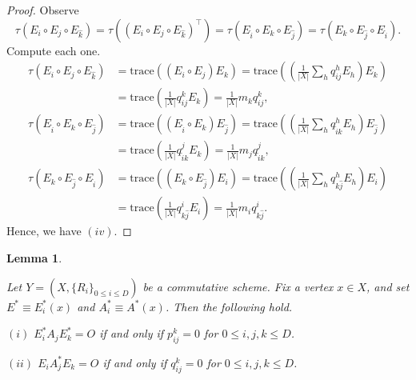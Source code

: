 \documentclass[
]{book}
\newtheorem{lemma}{Lemma}[chapter]
\theoremstyle{definition}
\theoremstyle{definition}
\theoremstyle{definition}
\theoremstyle{definition}
\theoremstyle{remark}
\begin{document}
\begin{proof}
Observe
\[\tau(E_i\circ E_j \circ E_{\hat{k}}) = \tau((E_i\circ E_j\circ E_{\hat{k}})^\top) = \tau(E_{\hat{i}}\circ E_k \circ E_{\hat{j}}) = \tau(E_k\circ E_{\hat{j}}\circ E_{\hat{i}}).\]
Compute each one.
\begin{align}
\tau(E_i\circ E_j \circ E_{\hat{k}}) & = \mathrm{trace}((E_i\circ E_j)E_k) = \mathrm{trace}\left(\left(\frac{1}{|X|}\sum_{h} q^h_{ij}E_h\right)E_k\right)\\
& = \mathrm{trace}\left(\frac{1}{|X|} q^k_{ij}E_k\right) = \frac{1}{|X|}m_kq^k_{ij},\\
\tau(E_{\hat{i}}\circ E_k \circ E_{\hat{j}}) & = \mathrm{trace}((E_{\hat{i}}\circ E_k)E_{\hat{j}}) = \mathrm{trace}\left(\left(\frac{1}{|X|}\sum_{h} q^h_{\hat{i}k}E_h\right)E_{\hat{j}}\right)\\
& = \mathrm{trace}\left(\frac{1}{|X|} q^j_{\hat{i}k}E_k\right) = \frac{1}{|X|}m_jq^j_{\hat{i}k},\\
\tau(E_k\circ E_{\hat{j}}\circ E_{\hat{i}}) & = \mathrm{trace}((E_k\circ E_{\hat{j}})E_i) = \mathrm{trace}\left(\left(\frac{1}{|X|}\sum_{h} q^h_{k\hat{j}}E_h\right)E_i\right)\\
& = \mathrm{trace}\left(\frac{1}{|X|} q^i_{k\hat{j}}E_i\right) = \frac{1}{|X|}m_iq^i_{k\hat{j}}.
\end{align}
Hence, we have \((iv)\).

\end{proof}

\begin{lemma}
\protect\hypertarget{lem:vanishing-condition}{}\label{lem:vanishing-condition}

Let \(Y = (X, \{R_i\}_{0\leq i\leq D})\) be a commutative scheme. Fix a vertex \(x\in X\), and set \(E^*\equiv E^*_i(x)\) and \(A^*_i \equiv A^*(x)\).
Then the following hold.

\((i)\) \(E^*_iA_jE^*_k = O\) if and only if \(p^k_{ij} = 0\) for \(0\leq i,j,k\leq D\).

\((ii)\) \(E_iA^*_jE_k = O\) if and only if \(q^k_{ij} = 0\) for \(0\leq i,j,k\leq D\).

\end{lemma}
\end{document}
